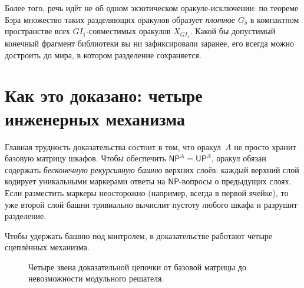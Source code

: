 \documentclass[11pt,a4paper]{article}
\newcommand{\NP}{\mathsf{NP}}
\newcommand{\UP}{\mathsf{UP}}
\newcommand{\OR}{\mathrm{OR}}
\newcommand{\GI}{GI_1}
\begin{document}
Более того, речь идёт не об одном экзотическом оракуле-исключении: по теореме Бэра множество таких разделяющих оракулов образует \emph{плотное $G_\delta$} в компактном пространстве всех $\GI$-совместимых оракулов $X_{\GI}$. Какой бы допустимый конечный фрагмент библиотеки вы ни зафиксировали заранее, его всегда можно достроить до мира, в котором разделение сохраняется.

\section{Как это доказано: четыре инженерных механизма}

Главная трудность доказательства состоит в том, что оракул~$A$ не просто хранит базовую матрицу шкафов. Чтобы обеспечить $\NP^A = \UP^A$, оракул обязан содержать \emph{бесконечную рекурсивную башню} верхних слоёв: каждый верхний слой кодирует уникальными маркерами ответы на $\NP$-вопросы о предыдущих слоях. Если разместить маркеры неосторожно (например, всегда в первой ячейке), то уже второй слой башни тривиально вычислит пустоту любого шкафа и разрушит разделение.

Чтобы удержать башню под контролем, в доказательстве работают четыре сцеплённых механизма.

\begin{figure}[!htbp]
\centering
{}
\caption{Четыре звена доказательной цепочки от базовой матрицы до невозможности модульного решателя.}
\end{figure}
\end{document}
